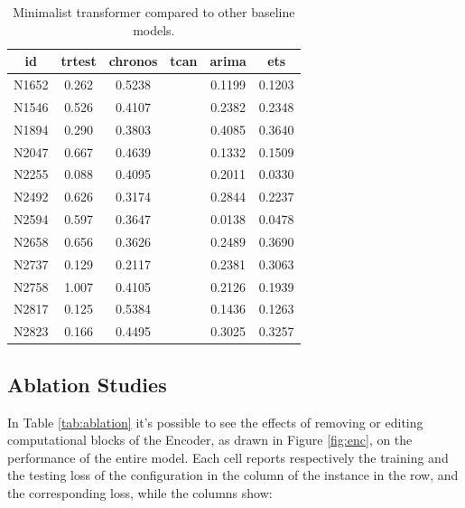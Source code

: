 \documentclass[algorithms,article,submit,pdftex,moreauthors]{Definitions/mdpi}
\begin{document}
\begin{table}[H]
	\caption{Minimalist transformer compared to other baseline models.}
	\label{tab:comparisons}
	\centering
	\begin{tabular}{c|ccccc}
		\toprule
		id   & trtest & chronos & tcan & arima & ets \\
		\midrule
		N1652 & 0.262 & 0.5238 & & 0.1199 & 0.1203 \\
		N1546 & 0.526 & 0.4107 & & 0.2382 & 0.2348 \\
		N1894 & 0.290 & 0.3803 & & 0.4085 & 0.3640 \\
		N2047 & 0.667 & 0.4639 & & 0.1332 & 0.1509 \\
		N2255 & 0.088 & 0.4095 & & 0.2011 & 0.0330 \\
		N2492 & 0.626 & 0.3174 & & 0.2844 & 0.2237 \\
		N2594 & 0.597 & 0.3647 & & 0.0138 & 0.0478 \\
		N2658 & 0.656 & 0.3626 & & 0.2489 & 0.3690 \\
		N2737 & 0.129 & 0.2117 & & 0.2381 & 0.3063 \\
		N2758 & 1.007 & 0.4105 & & 0.2126 & 0.1939 \\
		N2817 & 0.125 & 0.5384 & & 0.1436 & 0.1263 \\
		N2823 & 0.166 & 0.4495 & & 0.3025 & 0.3257 \\
		\bottomrule
	\end{tabular}
\end{table}

\subsection{Ablation Studies}

In Table \ref{tab:ablation} it's possible to see the effects of removing or editing computational blocks of the Encoder, as drawn in Figure \ref{fig:enc}, on the performance of the entire model. Each cell reports respectively the training and the testing loss of the configuration in the column of the instance in the row, and the corresponding loss, while the columns show:
\end{document}
